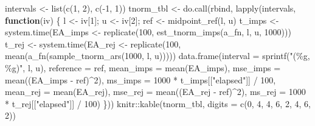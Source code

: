 \documentclass[
  letterpaper,
  DIV=11,
  numbers=noendperiod]{scrreprt}
\newenvironment{Shaded}{\begin{snugshade}}{\end{snugshade}}
\newcommand{\AttributeTok}[1]{\textcolor[rgb]{0.40,0.45,0.13}{#1}}
\newcommand{\ControlFlowTok}[1]{\textcolor[rgb]{0.00,0.23,0.31}{\textbf{#1}}}
\newcommand{\DecValTok}[1]{\textcolor[rgb]{0.68,0.00,0.00}{#1}}
\newcommand{\FunctionTok}[1]{\textcolor[rgb]{0.28,0.35,0.67}{#1}}
\newcommand{\NormalTok}[1]{\textcolor[rgb]{0.00,0.23,0.31}{#1}}
\newcommand{\OtherTok}[1]{\textcolor[rgb]{0.00,0.23,0.31}{#1}}
\newcommand{\SpecialCharTok}[1]{\textcolor[rgb]{0.37,0.37,0.37}{#1}}
\newcommand{\StringTok}[1]{\textcolor[rgb]{0.13,0.47,0.30}{#1}}
\begin{document}
\begin{Shaded}
\begin{Highlighting}[]
\NormalTok{intervals }\OtherTok{\textless{}{-}} \FunctionTok{list}\NormalTok{(}\FunctionTok{c}\NormalTok{(}\DecValTok{1}\NormalTok{, }\DecValTok{2}\NormalTok{), }\FunctionTok{c}\NormalTok{(}\SpecialCharTok{{-}}\DecValTok{1}\NormalTok{, }\DecValTok{1}\NormalTok{))}
\NormalTok{tnorm\_tbl }\OtherTok{\textless{}{-}} \FunctionTok{do.call}\NormalTok{(rbind, }\FunctionTok{lapply}\NormalTok{(intervals, }\ControlFlowTok{function}\NormalTok{(iv) \{}
\NormalTok{    l }\OtherTok{\textless{}{-}}\NormalTok{ iv[}\DecValTok{1}\NormalTok{]; u }\OtherTok{\textless{}{-}}\NormalTok{ iv[}\DecValTok{2}\NormalTok{]; ref }\OtherTok{\textless{}{-}} \FunctionTok{midpoint\_ref}\NormalTok{(l, u)}
\NormalTok{    t\_imps }\OtherTok{\textless{}{-}} \FunctionTok{system.time}\NormalTok{(EA\_imps }\OtherTok{\textless{}{-}} \FunctionTok{replicate}\NormalTok{(}\DecValTok{100}\NormalTok{, }\FunctionTok{est\_tnorm\_imps}\NormalTok{(a\_fn, l, u, }\DecValTok{1000}\NormalTok{)))}
\NormalTok{    t\_rej  }\OtherTok{\textless{}{-}} \FunctionTok{system.time}\NormalTok{(EA\_rej  }\OtherTok{\textless{}{-}} \FunctionTok{replicate}\NormalTok{(}\DecValTok{100}\NormalTok{, }\FunctionTok{mean}\NormalTok{(}\FunctionTok{a\_fn}\NormalTok{(}\FunctionTok{sample\_tnorm\_ars}\NormalTok{(}\DecValTok{1000}\NormalTok{, l, u)))))}
    \FunctionTok{data.frame}\NormalTok{(}\AttributeTok{interval =} \FunctionTok{sprintf}\NormalTok{(}\StringTok{"(\%g, \%g)"}\NormalTok{, l, u), }\AttributeTok{reference =}\NormalTok{ ref,}
               \AttributeTok{mean\_imps =} \FunctionTok{mean}\NormalTok{(EA\_imps), }\AttributeTok{mse\_imps =} \FunctionTok{mean}\NormalTok{((EA\_imps }\SpecialCharTok{{-}}\NormalTok{ ref)}\SpecialCharTok{\^{}}\DecValTok{2}\NormalTok{),}
               \AttributeTok{ms\_imps =} \DecValTok{1000} \SpecialCharTok{*}\NormalTok{ t\_imps[[}\StringTok{"elapsed"}\NormalTok{]] }\SpecialCharTok{/} \DecValTok{100}\NormalTok{,}
               \AttributeTok{mean\_rej =} \FunctionTok{mean}\NormalTok{(EA\_rej), }\AttributeTok{mse\_rej =} \FunctionTok{mean}\NormalTok{((EA\_rej }\SpecialCharTok{{-}}\NormalTok{ ref)}\SpecialCharTok{\^{}}\DecValTok{2}\NormalTok{),}
               \AttributeTok{ms\_rej =} \DecValTok{1000} \SpecialCharTok{*}\NormalTok{ t\_rej[[}\StringTok{"elapsed"}\NormalTok{]] }\SpecialCharTok{/} \DecValTok{100}\NormalTok{)}
\NormalTok{\}))}
\NormalTok{knitr}\SpecialCharTok{::}\FunctionTok{kable}\NormalTok{(tnorm\_tbl, }\AttributeTok{digits =} \FunctionTok{c}\NormalTok{(}\DecValTok{0}\NormalTok{, }\DecValTok{4}\NormalTok{, }\DecValTok{4}\NormalTok{, }\DecValTok{6}\NormalTok{, }\DecValTok{2}\NormalTok{, }\DecValTok{4}\NormalTok{, }\DecValTok{6}\NormalTok{, }\DecValTok{2}\NormalTok{))}
\end{Highlighting}
\end{Shaded}
\end{document}
